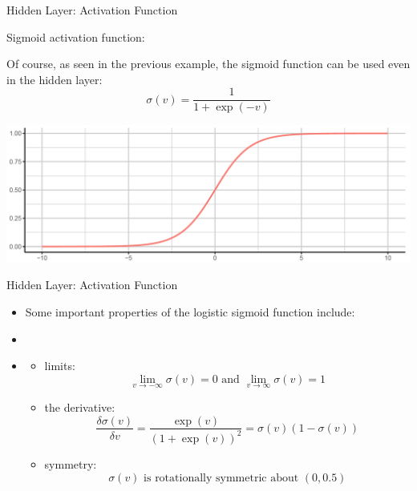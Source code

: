 \begin{frame} {Hidden Layer: Activation Function}
  \begin{blocki}{Sigmoid activation function:}
  \item Of course, as seen in the previous example, the sigmoid function can be used even in the hidden layer:
    $$ \sigma(v) = \frac{1}{1+\exp (-v)} $$
  \end{blocki}
  
\begin{center}
\includegraphics[width=1\textwidth]{plots/Sigmoid.png}
\end{center}

\end{frame}
\begin{frame}{Hidden Layer: Activation Function}
  \begin{itemize}
    \item Some important properties of the logistic sigmoid function include:
    \item[]
    \item[]
    \begin{itemize}
      \item limits: $$\lim_{v \to -\infty} \sigma(v) = 0 \text{ and } \lim_{v \to \infty} \sigma(v) = 1$$
      \item the derivative: $$\frac{\delta\sigma(v)}{\delta v}=\frac{\exp(v)}{(1+\exp(v))^2} = \sigma(v)(1-\sigma(v))$$
      \item symmetry: $$\sigma(v) \text{ is rotationally symmetric about } (0, 0.5)$$ 
            
    \end{itemize}
  \end{itemize}
\end{frame}
